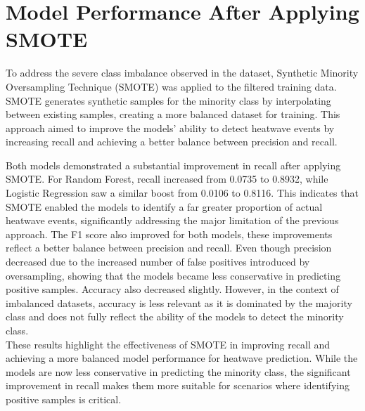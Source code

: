 \documentclass[conference,9pt]{IEEEtran}
\begin{document}
\section{Model Performance After Applying SMOTE}
To address the severe class imbalance observed in the dataset, Synthetic Minority Oversampling Technique (SMOTE) was applied to the filtered training data. SMOTE generates synthetic samples for the minority class by interpolating between existing samples, creating a more balanced dataset for training. This approach aimed to improve the models' ability to detect heatwave events by increasing recall and achieving a better balance between precision and recall.
\begin{table}[h]
\centering
\caption{Performance Metrics After Applying SMOTE}
\label{tab:performance_smote}
\end{table}
Both models demonstrated a substantial improvement in recall after applying SMOTE. For Random Forest, recall increased from 0.0735 to 0.8932, while Logistic Regression saw a similar boost from 0.0106 to 0.8116. This indicates that SMOTE enabled the models to identify a far greater proportion of actual heatwave events, significantly addressing the major limitation of the previous approach. The F1 score also improved for both models, these improvements reflect a better balance between precision and recall. Even though precision decreased due to the increased number of false positives introduced by oversampling, showing that the models became less conservative in predicting positive samples. Accuracy also decreased slightly. However, in the context of imbalanced datasets, accuracy is less relevant as it is dominated by the majority class and does not fully reflect the ability of the models to detect the minority class.\\
These results highlight the effectiveness of SMOTE in improving recall and achieving a more balanced model performance for heatwave prediction. While the models are now less conservative in predicting the minority class, the significant improvement in recall makes them more suitable for scenarios where identifying positive samples is critical.
\end{document}
